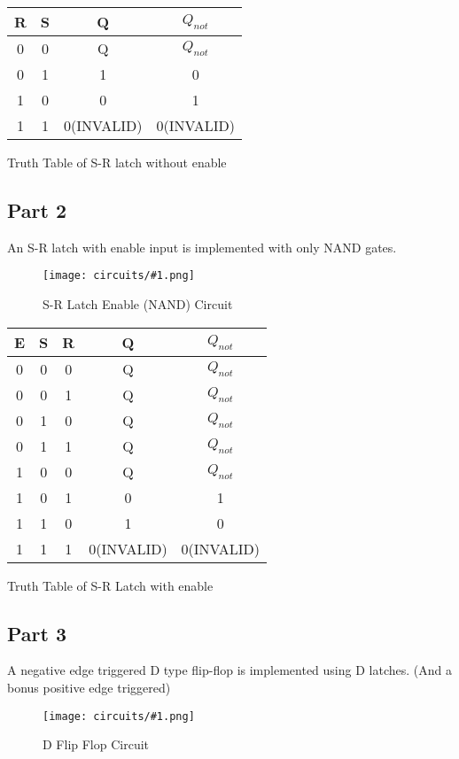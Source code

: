 \documentclass[pdftex,12pt,a4paper]{article}
\theoremstyle{plain}
\newcommand{\circuit}[1]{
    \begin{figure}[H]
    	\centering
    	\texttt{[image: circuits/\#1.png]}
    	\caption{#1 Circuit}
    	\label{fig7}
    \end{figure}
    \vspace{1cm}
}
\begin{document}
        \begin{center}
            \begin{tabular}{c c | c c}
                R & S & Q & $Q_{not}$ \\
                \hline 
                0 & 0 & Q & $Q_{not}$ \\
                0 & 1 & 1 & 0 \\
                1 & 0 & 0 & 1 \\
                1 & 1 & 0(INVALID) & 0(INVALID) \\
            \end{tabular}
        \end{center}
        {\centering Truth Table of S-R latch without enable\\}

    \newpage
    \subsection{Part 2}
        An S-R latch with enable input is implemented with only NAND gates.
        \circuit{S-R Latch Enable (NAND)}

        \begin{center}
            \begin{tabular}{c c c | c c}
                E & S & R & Q & $Q_{not}$ \\
                \hline 
                0 & 0 & 0 & Q & $Q_{not}$ \\
                0 & 0 & 1 & Q & $Q_{not}$ \\
                0 & 1 & 0 & Q & $Q_{not}$ \\
                0 & 1 & 1 & Q & $Q_{not}$ \\
                1 & 0 & 0 & Q & $Q_{not}$ \\
                1 & 0 & 1 & 0 & 1 \\
                1 & 1 & 0 & 1 & 0  \\
                1 & 1 & 1 & 0(INVALID) & 0(INVALID) \\
            \end{tabular}
        \end{center}
        {\centering Truth Table of S-R Latch with enable\\}
        
    \newpage
    \subsection{Part 3}
        A negative edge triggered D type flip-flop is implemented using D latches. (And a bonus positive edge triggered)
        \circuit{D Flip Flop}
\end{document}
